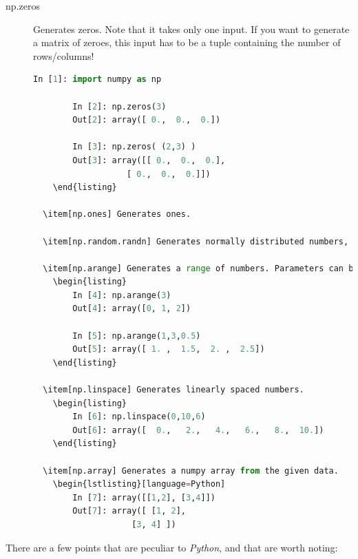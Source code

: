\begin{description}
  \item[np.zeros] Generates zeros. Note that it takes only one input. If you want to generate a matrix of zeroes, this input has to be a tuple containing the number of rows/columns!

    \begin{lstlisting}[language=python]
        In [1]: import numpy as np

        In [2]: np.zeros(3)
        Out[2]: array([ 0.,  0.,  0.])

        In [3]: np.zeros( (2,3) )
        Out[3]: array([[ 0.,  0.,  0.],
                   [ 0.,  0.,  0.]])
    \end{listing}

  \item[np.ones] Generates ones.

  \item[np.random.randn] Generates normally distributed numbers, with a mean of 0 and a standard deviation of 1.

  \item[np.arange] Generates a range of numbers. Parameters can be \lstinline{start, end, steppingInterval}. Note that the end-value is excluded!
    \begin{listing}
        In [4]: np.arange(3)
        Out[4]: array([0, 1, 2])

        In [5]: np.arange(1,3,0.5)
        Out[5]: array([ 1. ,  1.5,  2. ,  2.5])
    \end{listing}

  \item[np.linspace] Generates linearly spaced numbers.
    \begin{listing}
        In [6]: np.linspace(0,10,6)
        Out[6]: array([  0.,   2.,   4.,   6.,   8.,  10.])
    \end{listing}

  \item[np.array] Generates a numpy array from the given data.
    \begin{lstlisting}[language=Python]
        In [7]: array([[1,2], [3,4]])
        Out[7]: array([ [1, 2],
                    [3, 4] ])
    \end{lstlisting}

\end{description}

There are a few points that are peculiar to \emph{Python}, and that are worth noting:


